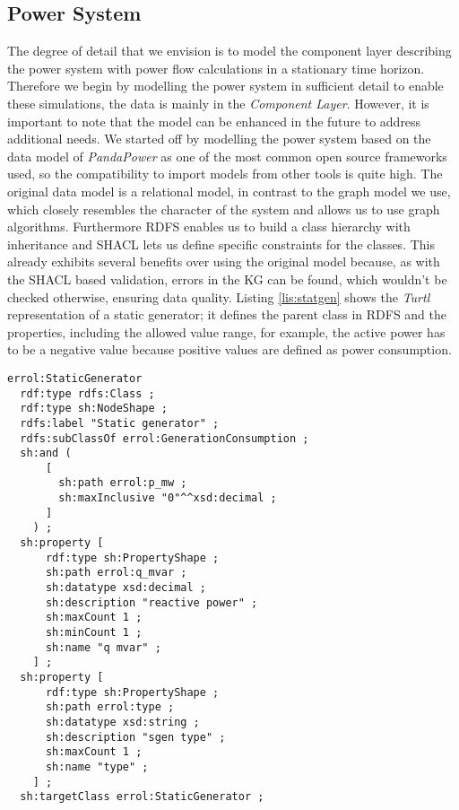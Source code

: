 \subsection{Power System}
\label{subsec:powersystem}
The degree of detail that we envision is to model the component layer describing the power system with power flow calculations in a stationary time horizon.
Therefore we begin by modelling the power system in sufficient detail to enable these simulations, the data is mainly in the \textit{Component Layer}.
However, it is important to note that the model can be enhanced in the future to address additional needs.
We started off by modelling the power system based on the data model of \textit{PandaPower}\cite{pandapower_2018} as one of the most common open source frameworks used, so the compatibility to import models from other tools is quite high.
The original data model is a relational model, in contrast to the graph model we use, which closely resembles the character of the system and allows us to use graph algorithms.
Furthermore \ac{RDFS} enables us to build a class hierarchy with inheritance and \ac{SHACL} lets us define specific constraints for the classes.
This already exhibits several benefits over using the original model because, as with the \ac{SHACL} based validation, errors in the \ac{KG} can be found, which wouldn't be checked otherwise, ensuring data quality.
Listing \ref{lis:statgen} shows the \textit{Turtl} representation of a static generator; it defines the parent class in \ac{RDFS} and the properties, including the allowed value range, for example, the active power has to be a negative value because positive values are defined as power consumption.

\begin{lstlisting}[language=turtle, caption={Representation of the \ac{RDFS} and \ac{SHACL} shapes of a static genarotor in \textit{Turtl}.}, label={lis:statgen}]
errol:StaticGenerator
  rdf:type rdfs:Class ;
  rdf:type sh:NodeShape ;
  rdfs:label "Static generator" ;
  rdfs:subClassOf errol:GenerationConsumption ;
  sh:and (
      [
        sh:path errol:p_mw ;
        sh:maxInclusive "0"^^xsd:decimal ;
      ]
    ) ;
  sh:property [
      rdf:type sh:PropertyShape ;
      sh:path errol:q_mvar ;
      sh:datatype xsd:decimal ;
      sh:description "reactive power" ;
      sh:maxCount 1 ;
      sh:minCount 1 ;
      sh:name "q mvar" ;
    ] ;
  sh:property [
      rdf:type sh:PropertyShape ;
      sh:path errol:type ;
      sh:datatype xsd:string ;
      sh:description "sgen type" ;
      sh:maxCount 1 ;
      sh:name "type" ;
    ] ;
  sh:targetClass errol:StaticGenerator ;
\end{lstlisting}

